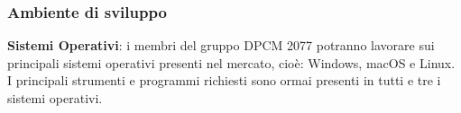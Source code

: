 \subsubsection{Ambiente di sviluppo}
\begin{description}
\item{\textbf{Sistemi Operativi}}: i membri del gruppo DPCM 2077 potranno lavorare sui principali sistemi operativi presenti nel mercato, cioè: Windows, macOS e Linux.
I principali strumenti e programmi richiesti sono ormai presenti in tutti e tre i sistemi operativi.
\end{description}


